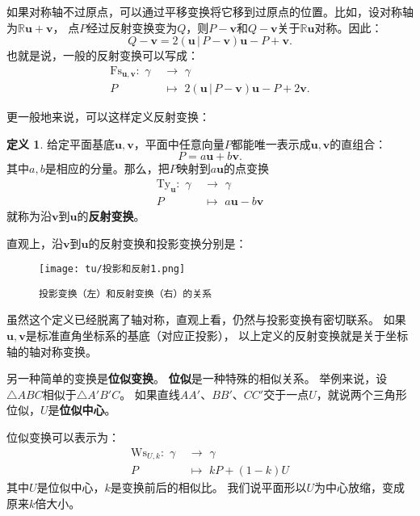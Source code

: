 \documentclass[12pt,UTF8]{ctexbook}
\theoremstyle{definition}
\newtheorem{df}{定义}[section]
\theoremstyle{plain}
\begin{document}
如果对称轴不过原点，可以通过平移变换将它移到过原点的位置。比如，设对称轴为$\mathbb{R}\mathbf{u} + \mathbf{v}$，
点$P$经过反射变换变为$Q$，则$P - \mathbf{v}$和$Q - \mathbf{v}$关于$\mathbb{R}\mathbf{u}$对称。因此：
$$ Q - \mathbf{v} = 2(\mathbf{u}\,|\,P - \mathbf{v})\mathbf{u} - P + \mathbf{v}. $$
也就是说，一般的反射变换可以写成：
\begin{align*}
    \mathrm{Fs}_{\mathbf{u}, \mathbf{v}} : \,\, \gamma\,\,&\rightarrow \,\, \gamma  \\
    P &\mapsto \,\, 2(\mathbf{u}\,|\,P - \mathbf{v})\mathbf{u} - P + 2\mathbf{v}. 
\end{align*}

更一般地来说，可以这样定义反射变换：
\begin{df}
    给定平面基底$\mathbf{u}, \mathbf{v}$，平面中任意向量$P$都能唯一表示成$\mathbf{u}, \mathbf{v}$的直组合：
    $$ P = a\mathbf{u} + b\mathbf{v}.$$
    其中$a, b$是相应的分量。那么，把$P$映射到$a\mathbf{u}$的点变换
    \begin{align*}
        \mathrm{Ty}_\mathbf{u} : \,\, \gamma\,\,&\rightarrow \,\, \gamma  \\
        P &\mapsto \,\, a\mathbf{u} - b\mathbf{v}
    \end{align*}
    就称为沿$\mathbf{v}$到$\mathbf{u}$的\textbf{反射变换}。
\end{df}

直观上，沿$\mathbf{v}$到$\mathbf{u}$的反射变换和投影变换分别是：

\begin{figure}[H]
    \vspace{4pt}
    \centering
    \texttt{[image: tu/投影和反射1.png]}
    \caption*{\texttt{投影变换（左）和反射变换（右）的关系}}
\end{figure}

虽然这个定义已经脱离了轴对称，直观上看，仍然与投影变换有密切联系。
如果$\mathbf{u}, \mathbf{v}$是标准直角坐标系的基底（对应正投影），
以上定义的反射变换就是关于坐标轴的轴对称变换。

另一种简单的变换是\textbf{位似变换}。
\textbf{位似}是一种特殊的相似关系。
举例来说，设$\triangle ABC$相似于$\triangle A'B'C$。
如果直线$AA'$、$BB'$、$CC'$交于一点$U$，就说两个三角形位似，$U$是\textbf{位似中心}。

位似变换可以表示为：
\begin{align*}
    \mathrm{Ws}_{U, k} : \,\, \gamma\,\,&\rightarrow \,\, \gamma  \\
    P &\mapsto \,\, kP + (1 - k)U 
\end{align*}
其中$U$是位似中心，$k$是变换前后的相似比。
我们说平面形以$U$为中心放缩，变成原来$k$倍大小。
\end{document}
